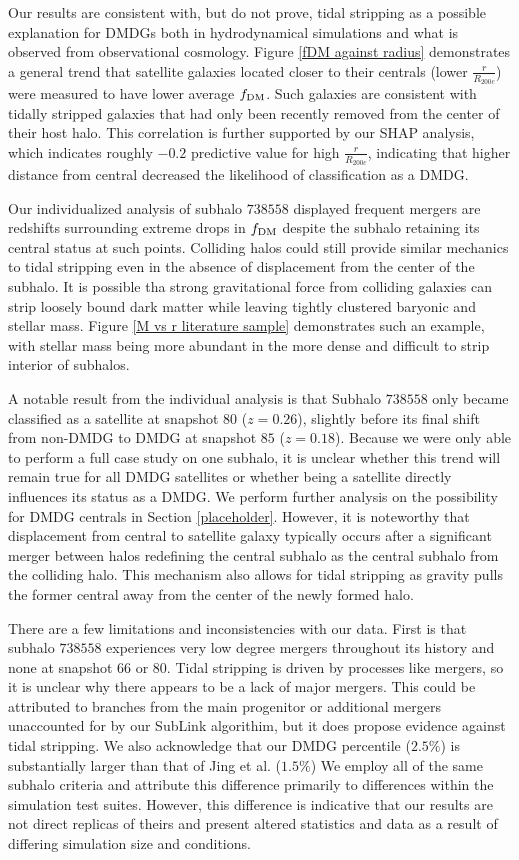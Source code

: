 \documentclass[twocolumn]{openjournal}
\begin{document}
Our results are consistent with, but do not prove, tidal stripping as a possible explanation for DMDGs both in hydrodynamical simulations and what is observed from observational cosmology. Figure \ref{fDM against radius} demonstrates a general trend that satellite galaxies located closer to their centrals (lower $\frac{r}{R_{200c}}$) were measured to have lower average $f_\textup{DM}$. Such galaxies are consistent with tidally stripped galaxies that had only been recently removed from the center of their host halo. This correlation is further supported by our SHAP analysis, which indicates roughly $-0.2$ predictive value for high $\frac{r}{R_{200c}}$, indicating that higher distance from central decreased the likelihood of classification as a DMDG. 

Our individualized analysis of subhalo $738558$ displayed frequent mergers are redshifts surrounding extreme drops in $f_\textup{DM}$ despite the subhalo retaining its central status at such points. Colliding halos could still provide similar mechanics to tidal stripping even in the absence of displacement from the center of the subhalo. It is possible tha strong gravitational force from colliding galaxies can strip loosely bound dark matter while leaving tightly clustered baryonic and stellar mass. Figure \ref{M vs r literature sample} demonstrates such an example, with stellar mass being more abundant in the more dense and difficult to strip interior of subhalos. 

A notable result from the individual analysis is that Subhalo $738558$ only became classified as a satellite at snapshot $80$ ($z=0.26$), slightly before its final shift from non-DMDG to DMDG at snapshot $85$ ($z=0.18$). Because we were only able to perform a full case study on one subhalo, it is unclear whether this trend will remain true for all DMDG satellites or whether being a satellite directly influences its status as a DMDG. We perform further analysis on the possibility for DMDG centrals in Section \ref{placeholder}. However, it is noteworthy that displacement from central to satellite galaxy typically occurs after a significant merger between halos redefining the central subhalo as the central subhalo from the colliding halo. This mechanism also allows for tidal stripping as gravity pulls the former central away from the center of the newly formed halo. 

There are a few limitations and inconsistencies with our data. First is that subhalo $738558$ experiences very low degree mergers throughout its history and none at snapshot $66$ or $80$. Tidal stripping is driven by processes like mergers, so it is unclear why there appears to be a lack of major mergers. This could be attributed to branches from the main progenitor or additional mergers unaccounted for by our SubLink algorithim, but it does propose evidence against tidal stripping. We also acknowledge that our DMDG percentile ($2.5\%$) is substantially larger than that of Jing et al. ($1.5\%$) We employ all of the same subhalo criteria and attribute this difference primarily to differences within the simulation test suites. However, this difference is indicative that our results are not direct replicas of theirs and present altered statistics and data as a result of differing simulation size and conditions. 
\end{document}
